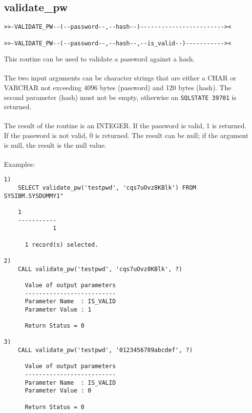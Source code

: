 \subsection{validate\_pw} \label{validatepw}
\begin{verbatim}
>>-VALIDATE_PW--(--password--,--hash--)------------------------><

>>-VALIDATE_PW--(--password--,--hash--,--is_valid--)-----------><
\end{verbatim}
This routine can be used to validate a password against a hash.\\
\\
The two input arguments can be character strings that are either a CHAR or VARCHAR not exceeding 4096 bytes (password) and 120 bytes (hash). The second parameter (hash) must not be empty, otherwise an \mbox{{\tt SQLSTATE 39701}} is returned.\\
\\
The result of the routine is an INTEGER. If the password is valid, 1 is returned. If the password is not valid, 0 is returned. The result can be null; if the argument is null, the result is the null value.\\
\\
Examples:
\begin{verbatim}
1)
    SELECT validate_pw('testpwd', 'cqs7uOvz8KBlk') FROM SYSIBM.SYSDUMMY1"

    1
    -----------
              1

      1 record(s) selected.

2)
    CALL validate_pw('testpwd', 'cqs7uOvz8KBlk', ?)

      Value of output parameters
      --------------------------
      Parameter Name  : IS_VALID
      Parameter Value : 1

      Return Status = 0

3)
    CALL validate_pw('testpwd', '0123456789abcdef', ?)

      Value of output parameters
      --------------------------
      Parameter Name  : IS_VALID
      Parameter Value : 0

      Return Status = 0
\end{verbatim}
